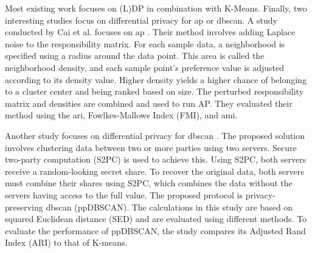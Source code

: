 Most existing work focuses on (L)DP in combination with K-Means.
Finally, two interesting studies focus on differential privacy for \gls{ap} or \gls{dbscan}.
A study conducted by Cai et al. focuses on \gls{ap} \citep{cai_dp-ap_2020}.
Their method involves adding Laplace noise to the responsibility matrix.
For each sample data, a neighborhood is specified using a radius around the data point.
This area is called the neighborhood density, and each sample point’s preference value is adjusted according to its density value.
Higher density yields a higher chance of belonging to a cluster center and being ranked based on size.
The perturbed responsibility matrix and densities are combined and used to run AP.
They evaluated their method using the  \gls{ari}, Fowlkes-Mallows Index (FMI), and \gls{ami}.

Another study focuses on differential privacy for \gls{dbscan} \citep{bozdemir_privacy-preserving_nodate}.
The proposed solution involves clustering data between two or more parties using two servers.
Secure two-party computation (S2PC) is used to achieve this.
Using S2PC, both servers receive a random-looking secret share.
To recover the original data, both servers must combine their shares using S2PC, which combines the data without the servers having access to the full value.
The proposed protocol is privacy-preserving \gls{dbscan} (ppDBSCAN).
The calculations in this study are based on squared Euclidean distance (SED) and are evaluated using different methods.
To evaluate the performance of ppDBSCAN, the study compares its Adjusted Rand Index (ARI) to that of K-means.

